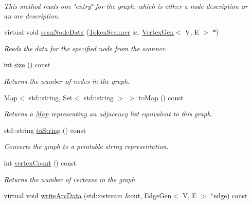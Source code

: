 \begin{DoxyCompactItemize}
\begin{DoxyCompactList}\small\item\em This method reads one \char`\"{}entry\char`\"{} for the graph, which is either a node description or an arc description. \end{DoxyCompactList}\item 
virtual void \mbox{\hyperlink{classGraph_a0fc2ca3535b7bff7759aa0c1d35ff08b}{scan\+Node\+Data}} (\mbox{\hyperlink{classTokenScanner}{Token\+Scanner}} \&, \mbox{\hyperlink{classVertexGen}{Vertex\+Gen}}$<$ V, E $>$ $\ast$)
\begin{DoxyCompactList}\small\item\em Reads the data for the specified node from the scanner. \end{DoxyCompactList}\item 
int \mbox{\hyperlink{classGraph_af9593d4a5ff4274efaf429cb4f9e57cc}{size}} () const
\begin{DoxyCompactList}\small\item\em Returns the number of nodes in the graph. \end{DoxyCompactList}\item 
\mbox{\hyperlink{classMap}{Map}}$<$ std\+::string, \mbox{\hyperlink{classSet}{Set}}$<$ std\+::string $>$ $>$ \mbox{\hyperlink{classBasicGraphGen_a66498d3675a5bc08fa30a032d41764f7}{to\+Map}} () const
\begin{DoxyCompactList}\small\item\em Returns a \mbox{\hyperlink{classMap}{Map}} representing an adjacency list equivalent to this graph. \end{DoxyCompactList}\item 
std\+::string \mbox{\hyperlink{classGraph_a1fe5121d6528fdea3f243321b3fa3a49}{to\+String}} () const
\begin{DoxyCompactList}\small\item\em Converts the graph to a printable string representation. \end{DoxyCompactList}\item 
int \mbox{\hyperlink{classBasicGraphGen_a68eb4830a4800ed7704895c16a8982be}{vertex\+Count}} () const
\begin{DoxyCompactList}\small\item\em Returns the number of vertexes in the graph. \end{DoxyCompactList}\item 
virtual void \mbox{\hyperlink{classBasicGraphGen_ae7be688f4ddbd7da8eb2a8c7eef8901c}{write\+Arc\+Data}} (std\+::ostream \&out, Edge\+Gen$<$ V, E $>$ $\ast$edge) const

\end{DoxyCompactItemize}
